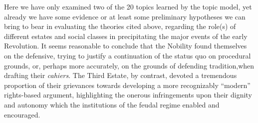 Here we have only examined two of the 20 topics learned by the topic model, yet already we have some evidence or at least some preliminary hypotheses we can bring to bear in evaluating the theories cited above, regarding the role(s) of different estates and social classes in precipitating the major events of the early Revolution. It seems reasonable to conclude that the Nobility found themselves on the defensive, trying to justify a continuation of the status quo on procedural grounds, or, perhaps more accurately, on the grounds of defending tradition,when drafting their \textit{cahiers}. The Third Estate, by contrast, devoted a tremendous proportion of their grievances towards developing a more recognizably ``modern'' rights-based argument, highlighting the onerous infringements upon their dignity and autonomy which the institutions of the feudal regime enabled and encouraged.

